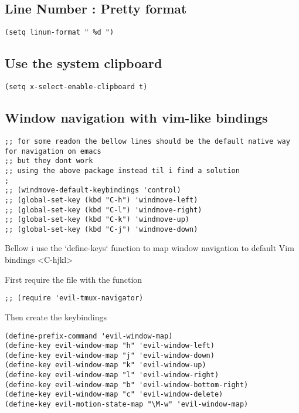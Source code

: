 \documentclass[11pt]{article}
\begin{document}
\subsection*{Line Number : Pretty format}
\label{sec:org9edaea9}
\begin{verbatim}
(setq linum-format " %d ")
\end{verbatim}



\subsection*{Use the system clipboard}
\label{sec:org33e2ee2}
\begin{verbatim}
(setq x-select-enable-clipboard t)
\end{verbatim}




\subsection*{Window navigation with vim-like bindings}
\label{sec:org2a8db27}

\begin{verbatim}
;; for some readon the bellow lines should be the default native way for navigation on emacs
;; but they dont work
;; using the above package instead til i find a solution
;
;; (windmove-default-keybindings 'control)
;; (global-set-key (kbd "C-h") 'windmove-left)
;; (global-set-key (kbd "C-l") 'windmove-right)
;; (global-set-key (kbd "C-k") 'windmove-up)
;; (global-set-key (kbd "C-j") 'windmove-down)
\end{verbatim}


Bellow i use the `define-keys` function to map window navigation to default Vim bindings <C-hjkl>

First require the file with the function

\begin{verbatim}
;; (require 'evil-tmux-navigator)
\end{verbatim}


Then create the keybindings 
\begin{verbatim}
(define-prefix-command 'evil-window-map)
(define-key evil-window-map "h" 'evil-window-left)
(define-key evil-window-map "j" 'evil-window-down)
(define-key evil-window-map "k" 'evil-window-up)
(define-key evil-window-map "l" 'evil-window-right)
(define-key evil-window-map "b" 'evil-window-bottom-right)
(define-key evil-window-map "c" 'evil-window-delete)
(define-key evil-motion-state-map "\M-w" 'evil-window-map)
\end{verbatim}
\end{document}
